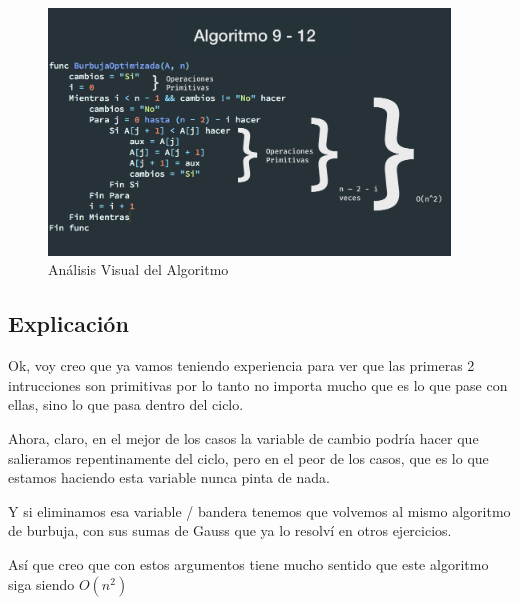 \documentclass[12pt, fleqn]{article}                            %
\theoremstyle{break}                                            %
\begin{document}
        \begin{figure}[h]
            \centering
            \includegraphics[width=0.95\textwidth]{Algoritmo9}
            \caption{Análisis Visual del Algoritmo}
        \end{figure}

    \vspace{1em}
    \subsection{Explicación}

        Ok, voy creo que ya vamos teniendo experiencia para ver que las 
        primeras 2 intrucciones son primitivas por lo tanto no importa mucho
        que es lo que pase con ellas, sino lo que pasa dentro del ciclo.

        Ahora, claro, en el mejor de los casos la variable de cambio podría hacer
        que salieramos repentinamente del ciclo, pero en el peor de los casos, que es
        lo que estamos haciendo esta variable nunca pinta de nada.

        Y si eliminamos esa variable / bandera tenemos que volvemos al mismo algoritmo
        de burbuja, con sus sumas de Gauss que ya lo resolví en otros ejercicios.

        Así que creo que con estos argumentos tiene mucho sentido que este algoritmo
        siga siendo $O(n^2)$



\clearpage
\end{document}
